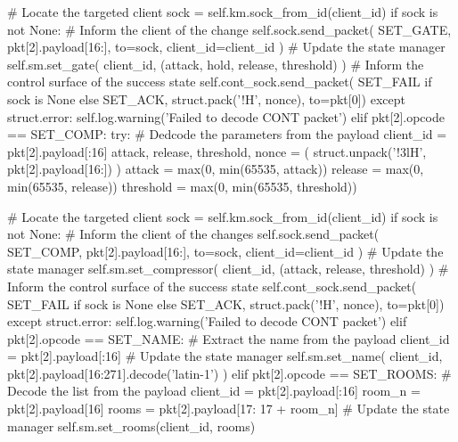 \begin{pythoncode}
                    # Locate the targeted client
                    sock = self.km.sock_from_id(client_id)
                    if sock is not None:
                        # Inform the client of the change
                        self.sock.send_packet(
                            SET_GATE,
                            pkt[2].payload[16:],
                            to=sock,
                            client_id=client_id
                        )
                        # Update the state manager
                        self.sm.set_gate(
                            client_id, (attack, hold, release, threshold)
                        )
                    # Inform the control surface of the success state
                    self.cont_sock.send_packet(
                        SET_FAIL if sock is None else SET_ACK,
                        struct.pack('!H', nonce), to=pkt[0])
                except struct.error:
                    self.log.warning('Failed to decode CONT packet')
            elif pkt[2].opcode == SET_COMP:
                try:
                    # Dedcode the parameters from the payload
                    client_id = pkt[2].payload[:16]
                    attack, release, threshold, nonce = (
                        struct.unpack('!3lH', pkt[2].payload[16:])
                    )
                    attack = max(0, min(65535, attack))
                    release = max(0, min(65535, release))
                    threshold = max(0, min(65535, threshold))

                    # Locate the targeted client
                    sock = self.km.sock_from_id(client_id)
                    if sock is not None:
                        # Inform the client of the changes
                        self.sock.send_packet(
                            SET_COMP,
                            pkt[2].payload[16:],
                            to=sock,
                            client_id=client_id
                        )
                        # Update the state manager
                        self.sm.set_compressor(
                            client_id,
                            (attack, release, threshold)
                        )
                    # Inform the control surface of the success state
                    self.cont_sock.send_packet(
                        SET_FAIL if sock is None else SET_ACK,
                        struct.pack('!H', nonce), to=pkt[0])
                except struct.error:
                    self.log.warning('Failed to decode CONT packet')
            elif pkt[2].opcode == SET_NAME:
                # Extract the name from the payload
                client_id = pkt[2].payload[:16]
                # Update the state manager
                self.sm.set_name(
                    client_id, pkt[2].payload[16:271].decode('latin-1')
                )
            elif pkt[2].opcode == SET_ROOMS:
                # Decode the list from the payload
                client_id = pkt[2].payload[:16]
                room_n = pkt[2].payload[16]
                rooms = pkt[2].payload[17: 17 + room_n]
                # Update the state manager
                self.sm.set_rooms(client_id, rooms)


\end{pythoncode}
